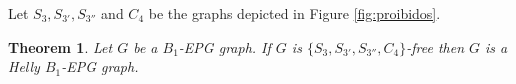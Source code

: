 \documentclass[9pt]{entcs}
\newtheorem{teo}[thm]{Theorem}%
\begin{document}


Let $S_{3}, S_{3'}, S_{3''}$ and $ C_{4}$ be the graphs depicted in Figure \ref{fig:proibidos}. 



\begin{teo}
\label{lem:chordalDiamondFree}
Let $G$ be a $B_1$-EPG graph. If $G$ is  $\{S_{3}, S_{3'}, S_{3''}, C_{4}\}$-free then $G$  is a Helly $B_1$-EPG graph.
\end{teo}
\end{document}
